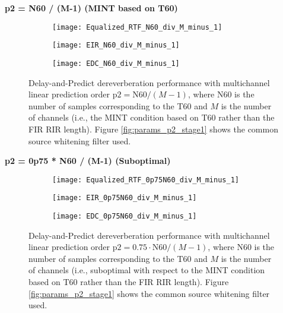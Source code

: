 \textbf{p2 = N60 / (M-1)  (MINT based on T60)}

\begin{figure}[H]
	\centering
	\begin{subfigure}[b]{0.32\textwidth}
		\centering
		\texttt{[image: Equalized\_RTF\_N60\_div\_M\_minus\_1]}
	\end{subfigure}
	\hfill
	\begin{subfigure}[b]{0.32\textwidth}
		\centering
		\texttt{[image: EIR\_N60\_div\_M\_minus\_1]}
	\end{subfigure}
	\hfill
	\begin{subfigure}[b]{0.32\textwidth}
		\centering
		\texttt{[image: EDC\_N60\_div\_M\_minus\_1]}
	\end{subfigure}
	\hfill
	\caption{Delay-and-Predict dereverberation performance with multichannel linear prediction order $\mathrm{p2} = \mathrm{N60} / (M-1)$, where N60 is the number of samples corresponding to the T60 and $M$ is the number of channels (i.e., the MINT condition based on T60 rather than the FIR RIR length). Figure \ref{fig:params_p2_stage1} shows the common source whitening filter used.}
	\label{fig:params_p2_N60}
\end{figure}

\textbf{p2 = 0p75 * N60 / (M-1) (Suboptimal)}

\begin{figure}[H]
	\centering
	\begin{subfigure}[b]{0.32\textwidth}
		\centering
		\texttt{[image: Equalized\_RTF\_0p75N60\_div\_M\_minus\_1]}
	\end{subfigure}
	\hfill
	\begin{subfigure}[b]{0.32\textwidth}
		\centering
		\texttt{[image: EIR\_0p75N60\_div\_M\_minus\_1]}
	\end{subfigure}
	\hfill
	\begin{subfigure}[b]{0.32\textwidth}
		\centering
		\texttt{[image: EDC\_0p75N60\_div\_M\_minus\_1]}
	\end{subfigure}
	\hfill
	\caption{Delay-and-Predict dereverberation performance with multichannel linear prediction order $\mathrm{p2} = 0.75 \cdot \mathrm{N60} / (M-1)$, where N60 is the number of samples corresponding to the T60 and $M$ is the number of channels (i.e., suboptimal with respect to the MINT condition based on T60 rather than the FIR RIR length). Figure \ref{fig:params_p2_stage1} shows the common source whitening filter used.}
	\label{fig:params_p2_0p75_N60}
\end{figure}

